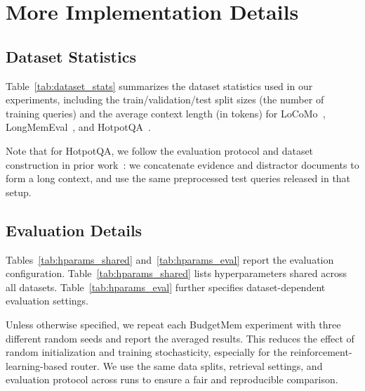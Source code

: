 \section{More Implementation Details}
\label{appendix:imple_detail}





\subsection{Dataset Statistics}
\label{appendix:dataset}


Table~\ref{tab:dataset_stats} summarizes the dataset statistics used in our experiments, including the train/validation/test split sizes (the number of training queries) and the average context length (in tokens) for LoCoMo~\citep{maharana2024evaluating-locomo}, LongMemEval~\citep{wu2024longmemeval}, and HotpotQA~\cite{yang2018hotpotqa}.

Note that for HotpotQA, we follow the evaluation protocol and dataset construction in prior work~\citep{yu2025memagent}: we concatenate evidence and distractor documents to form a long context, and use the same preprocessed test queries released in that setup.








\subsection{Evaluation Details}
\label{appendix:exp_eval}



Tables~\ref{tab:hparams_shared} and~\ref{tab:hparams_eval} report the evaluation configuration. Table~\ref{tab:hparams_shared} lists hyperparameters shared across all datasets. Table~\ref{tab:hparams_eval} further specifies dataset-dependent evaluation settings.

Unless otherwise specified, we repeat each BudgetMem experiment with three different random seeds and report the averaged results. 
This reduces the effect of random initialization and training stochasticity, especially for the reinforcement-learning-based router. 
We use the same data splits, retrieval settings, and evaluation protocol across runs to ensure a fair and reproducible comparison.







